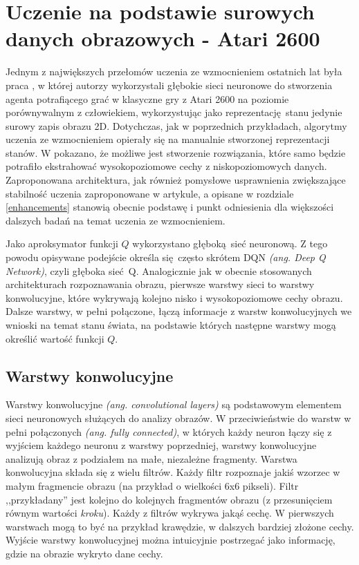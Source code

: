\section{Uczenie na podstawie surowych danych obrazowych - Atari 2600}

Jednym z największych przełomów uczenia ze wzmocnieniem ostatnich lat była praca \break \cite{mnih2015human}, w której autorzy wykorzystali głębokie sieci neuronowe do stworzenia agenta potrafiącego grać w klasyczne gry z Atari 2600 na poziomie porównywalnym z człowiekiem, wykorzystując jako reprezentację stanu jedynie surowy zapis obrazu 2D. Dotychczas, jak w poprzednich przykładach, algorytmy uczenia ze wzmocnieniem opierały się na manualnie stworzonej reprezentacji stanów. W \cite{mnih2015human} pokazano, że możliwe jest stworzenie rozwiązania, które samo będzie potrafiło ekstrahować wysokopoziomowe cechy z niskopoziomowych danych. Zaproponowana architektura, jak również pomysłowe usprawnienia zwiększające stabilność uczenia zaproponowane w artykule, a opisane w rozdziale \ref {enhancements} stanowią obecnie podstawę i punkt odniesienia dla większości dalszych badań na temat uczenia ze wzmocnieniem.

Jako aproksymator funkcji $Q$ wykorzystano głęboką sieć neuronową. Z tego powodu opisywane podejście określa się często skrótem DQN \textit{(ang. Deep Q Network)}, czyli głęboka sieć Q. Analogicznie jak w obecnie stosowanych architekturach rozpoznawania obrazu, pierwsze warstwy sieci to warstwy konwolucyjne, które wykrywają kolejno nisko i wysokopoziomowe cechy obrazu. Dalsze warstwy, w pełni połączone, łączą informacje z warstw konwolucyjnych we wnioski na temat stanu świata, na podstawie których następne warstwy mogą określić wartość funkcji $Q$.

\subsection{Warstwy konwolucyjne}
Warstwy konwolucyjne \textit{(ang. convolutional layers)} są podstawowym elementem sieci neuronowych służących do analizy obrazów. W przeciwieństwie do warstw w pełni połączonych \textit{(ang. fully connected)}, w których każdy neuron łączy się z wyjściem każdego neuronu z warstwy poprzedniej, warstwy konwolucyjne analizują obraz z podziałem na małe, niezależne fragmenty. Warstwa konwolucyjna składa się z wielu filtrów. Każdy filtr rozpoznaje jakiś wzorzec w małym fragmencie obrazu (na przykład o wielkości 6x6 pikseli). Filtr ,,przykładany'' jest kolejno do kolejnych fragmentów obrazu (z przesunięciem równym wartości \textit{kroku}). Każdy z filtrów wykrywa jakąś cechę. W pierwszych warstwach mogą to być na przykład krawędzie, w dalszych bardziej złożone cechy. Wyjście warstwy konwolucyjnej można intuicyjnie postrzegać jako informację, gdzie na obrazie wykryto dane cechy.



